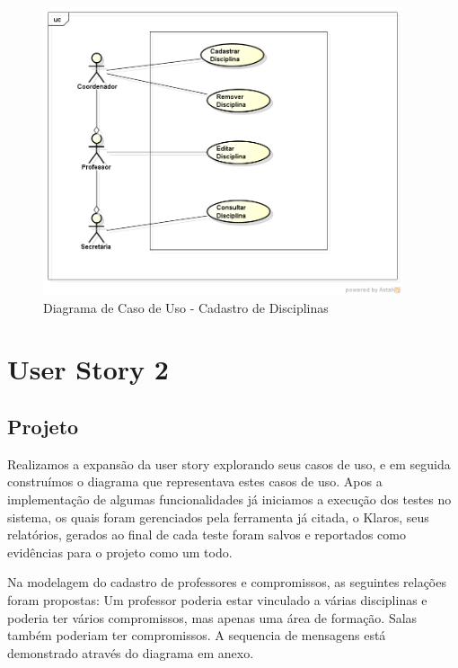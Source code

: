 \documentclass{abnt}
\begin{document}
		\begin{figure}[h]
			\begin{center}
				 \includegraphics[width=400px]{casoUsoDisciplinas}
				 \caption{Diagrama de Caso de Uso - Cadastro de Disciplinas}
				 \label{fig:casoUsoCadastroDisciplina}
			\end{center}
		\end{figure}
		\FloatBarrier
	
	\clearpage	
	\section{User Story 2}
	\subsection{Projeto}
	Realizamos a expansão da user story explorando seus casos de uso, e em seguida construímos o diagrama que representava estes casos de uso.
	Apos a implementação de algumas funcionalidades já iniciamos a execução dos testes no sistema, os quais foram gerenciados pela ferramenta já citada, o Klaros, seus relatórios, gerados ao final de cada teste foram salvos e reportados como evidências para o projeto como um todo. 
	
	Na modelagem do cadastro de professores e compromissos, as seguintes relações foram propostas:
	Um professor poderia estar vinculado a várias disciplinas e poderia ter vários compromissos, mas apenas uma área de formação.
	Salas também poderiam ter compromissos.
	A sequencia de mensagens está demonstrado através do diagrama em anexo.
	
\end{document}
